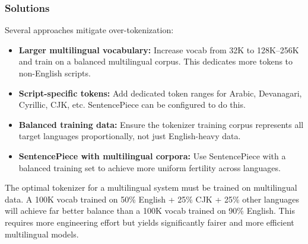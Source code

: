 \subsubsection*{Solutions}

Several approaches mitigate over-tokenization:

\begin{itemize}
  \item \textbf{Larger multilingual vocabulary:} Increase vocab from 32K to 128K–256K and train on a balanced multilingual corpus. This dedicates more tokens to non-English scripts.
  \item \textbf{Script-specific tokens:} Add dedicated token ranges for Arabic, Devanagari, Cyrillic, CJK, etc. SentencePiece can be configured to do this.
  \item \textbf{Balanced training data:} Ensure the tokenizer training corpus represents all target languages proportionally, not just English-heavy data.
  \item \textbf{SentencePiece with multilingual corpora:} Use SentencePiece with a balanced training set to achieve more uniform fertility across languages.
\end{itemize}

\begin{intuitionbox}
The optimal tokenizer for a multilingual system must be trained on multilingual data. A 100K vocab trained on 50\% English + 25\% CJK + 25\% other languages will achieve far better balance than a 100K vocab trained on 90\% English. This requires more engineering effort but yields significantly fairer and more efficient multilingual models.
\end{intuitionbox}

